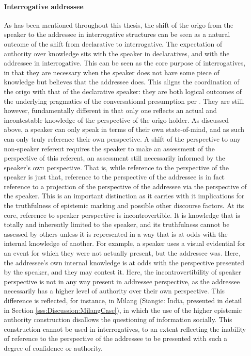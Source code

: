 \paragraph{Interrogative addressee}
As has been mentioned throughout this thesis, the shift of the origo from the speaker to the addressee in interrogative structures can be seen as a natural outcome of the shift from declarative to interrogative. The expectation of authority over knowledge sits with the speaker in declaratives, and with the addressee in interrogative. This can be seen as the core purpose of interrogatives, in that they are necessary when the speaker does not have some piece of knowledge but believes that the addressee does. This aligns the coordination of the origo with that of the declarative speaker: they are both logical outcomes of the underlying pragmatics of the conversational presumption per . They are still, however, fundamentally different in that only one reflects an actual and incontestable knowledge of the perspective of the origo holder. As discussed above, a speaker can only speak in terms of their own state-of-mind, and as such can only truly reference their own perspective. A shift of the perspective to any non-speaker referent requires the speaker to make an assessment of the perspective of this referent, an assessment still necessarily informed by the speaker's own perspective. That is, while reference to the perspective of the speaker is just that, reference to the perspective of the addressee is in fact reference to a projection of the perspective of the addressee via the perspective of the speaker. This is an important distinction as it carries with it implications for the truthfulness of epistemic marking and possible other discourse factors. At its core, reference to speaker perspective is incontrovertible. It is knowledge that is totally and inherently limited to the speaker, and its truthfulness cannot be assessed by others unless it is represented in a way that is at odds with the internal knowledge of another. For example, a speaker uses a visual evidential for an event for which they were not actually present, but the addressee was. Here, the addressee's own internal knowledge is at odds with the perspective presented by the speaker, and they may contest it. Here, the incontrovertibility of speaker perspective is not in any way present in addressee perspective, as the addressee necessarily has a higher level of authority over their own perspective. This difference is reflected, for instance, in Milang (Siangic: India, presented in detail in Section \ref{sss:Discussion:MilangCase}), in which the use of the higher epistemic authority construction disallows the questioning of information socially. This construction cannot be used in interrogatives, to an extent reflecting the inability of reference to the perspective of the addressee to be presented with such a degree of confidence or authority.


